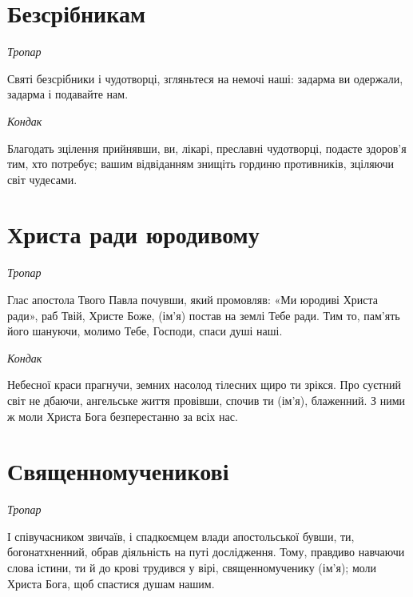 \documentclass[chapters.tex]{subfiles}
\begin{document}
\section{Безсрібникам}
\emph{Тропар}

Святі безсрібники і чудотворці, згляньтеся на немочі наші: задарма ви одержали, задарма і подавайте нам.

\emph{Кондак}

Благодать зцілення прийнявши, ви, лікарі, преславні чудотворці, подаєте здоров’я тим, хто потребує; вашим відвіданням знищіть гординю противників, зціляючи світ чудесами.

\section{Христа ради юродивому}
\emph{Тропар}

Глас апостола Твого Павла почувши, який промовляв: «Ми юродиві Христа ради», раб Твій, Христе Боже, (ім’я) постав на землі Тебе ради. Тим то, пам’ять його шануючи, молимо Тебе, Господи, спаси душі наші.

\emph{Кондак}

Небесної краси прагнучи, земних насолод тілесних щиро ти зрікся. Про суєтний світ не дбаючи, ангельське життя провівши, спочив ти (ім’я), блаженний. З ними ж моли Христа Бога безперестанно за всіх нас.

\section{Священномученикові}
\emph{Тропар}

І співучасником звичаїв, і спадкоємцем влади апостольської бувши, ти, богонатхненний, обрав діяльність на путі дослідження. Тому, правдиво навчаючи слова істини, ти й до крові трудився у вірі, священномученику (ім’я); моли Христа Бога, щоб спастися душам нашим.
\end{document}
